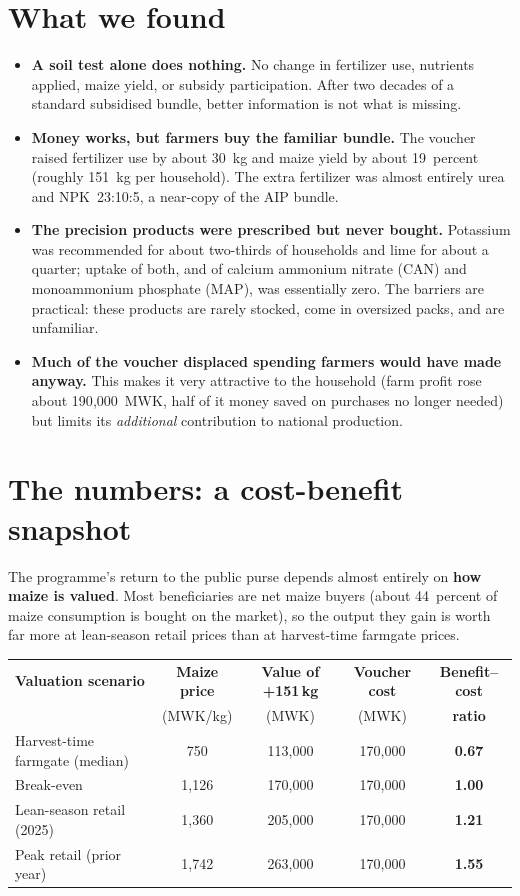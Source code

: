 \documentclass[10pt]{article}
\begin{document}
\section{What we found}
\begin{itemize}
\item \textbf{A soil test alone does nothing.} No change in fertilizer use, nutrients applied, maize yield, or subsidy participation. After two decades of a standard subsidised bundle, better information is not what is missing.
\item \textbf{Money works, but farmers buy the familiar bundle.} The voucher raised fertilizer use by about 30~kg and maize yield by about 19~percent (roughly 151~kg per household). The extra fertilizer was almost entirely urea and NPK~23:10:5, a near-copy of the AIP bundle.
\item \textbf{The precision products were prescribed but never bought.} Potassium was recommended for about two-thirds of households and lime for about a quarter; uptake of both, and of calcium ammonium nitrate (CAN) and monoammonium phosphate (MAP), was essentially zero. The barriers are practical: these products are rarely stocked, come in oversized packs, and are unfamiliar.
\item \textbf{Much of the voucher displaced spending farmers would have made anyway.} This makes it very attractive to the household (farm profit rose about 190{,}000~MWK, half of it money saved on purchases no longer needed) but limits its \emph{additional} contribution to national production.
\end{itemize}

\section{The numbers: a cost-benefit snapshot}
The programme's return to the public purse depends almost entirely on \textbf{how maize is valued}. Most beneficiaries are net maize buyers (about 44~percent of maize consumption is bought on the market), so the output they gain is worth far more at lean-season retail prices than at harvest-time farmgate prices.

\begin{center}
\small
\begin{tabular}{@{}lcccc@{}}
\toprule
\textbf{Valuation scenario} & \textbf{Maize price} & \textbf{Value of +151\,kg} & \textbf{Voucher cost} & \textbf{Benefit--cost} \\
 & (MWK/kg) & (MWK) & (MWK) & \textbf{ratio} \\
\midrule
Harvest-time farmgate (median) & 750 & 113{,}000 & 170{,}000 & \textbf{0.67} \\
Break-even & 1{,}126 & 170{,}000 & 170{,}000 & \textbf{1.00} \\
Lean-season retail (2025) & 1{,}360 & 205{,}000 & 170{,}000 & \textbf{1.21} \\
Peak retail (prior year) & 1{,}742 & 263{,}000 & 170{,}000 & \textbf{1.55} \\
\bottomrule
\end{tabular}
\end{center}
\end{document}
